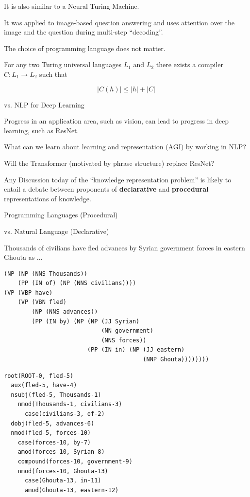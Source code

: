 {\vfill
It is also similar to a Neural Turing Machine.

\vfill
It was applied to image-based question answering and uses attention over the image and the question during multi-step ``decoding''.


The choice of programming language does not matter.

\vfill
For any two Turing universal languages $L_1$ and $L_2$ there exists a compiler $C: L_1 \rightarrow L_2$ such that

$$|C(h)| \leq |h| + |C|$$

{vs. NLP for Deep Learning}

Progress in an application area, such as vision, can lead to progress in deep learning, such as ResNet.

\vfill
What can we learn about learning and representation (AGI) by working in NLP?

\vfill
Will the Transformer (motivated by phrase structure) replace ResNet?


Any Discussion today of the ``knowledge representation problem'' is likely to entail a debate between proponents of {\bf declarative} and {\bf procedural} representations of knowledge.

\vfill
{}

\vfill
Programming Languages (Procedural)

\vfill
vs. Natural Language (Declarative)


Thousands of civilians have fled advances by Syrian government forces in eastern Ghouta as ...

\begin{verbatim}
(NP (NP (NNS Thousands))
    (PP (IN of) (NP (NNS civilians))))
(VP (VBP have)
    (VP (VBN fled)
        (NP (NNS advances))
        (PP (IN by) (NP (NP (JJ Syrian)
                            (NN government)
                            (NNS forces))
                        (PP (IN in) (NP (JJ eastern)
                                        (NNP Ghouta))))))))
\end{verbatim}


\begin{verbatim}
root(ROOT-0, fled-5)
  aux(fled-5, have-4)
  nsubj(fled-5, Thousands-1)
    nmod(Thousands-1, civilians-3)
      case(civilians-3, of-2)
  dobj(fled-5, advances-6)
  nmod(fled-5, forces-10)
    case(forces-10, by-7)
    amod(forces-10, Syrian-8)
    compound(forces-10, government-9)
    nmod(forces-10, Ghouta-13)
      case(Ghouta-13, in-11)
      amod(Ghouta-13, eastern-12)
\end{verbatim}

}
